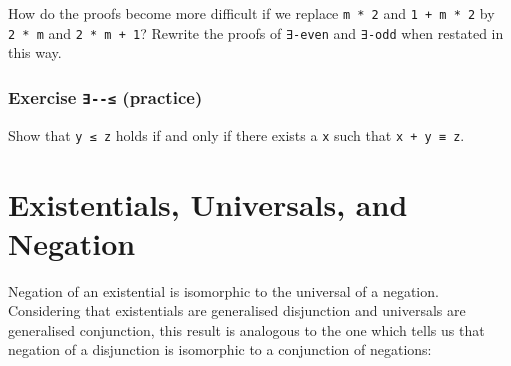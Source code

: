 How do the proofs become more difficult if we replace \texttt{m\ *\ 2}
and \texttt{1\ +\ m\ *\ 2} by \texttt{2\ *\ m} and
\texttt{2\ *\ m\ +\ 1}? Rewrite the proofs of \texttt{∃-even} and
\texttt{∃-odd} when restated in this way.

\begin{fence}
\begin{code}%
\>[0]\<%
\end{code}
\end{fence}

\hypertarget{exercise----practice}{%
\subsubsection{\texorpdfstring{Exercise \texttt{∃-\textbar{}-≤}
(practice)}{Exercise ∃-\textbar-≤ (practice)}}\label{exercise----practice}}

Show that \texttt{y\ ≤\ z} holds if and only if there exists a
\texttt{x} such that \texttt{x\ +\ y\ ≡\ z}.

\begin{fence}
\begin{code}%
\>[0]\<%
\end{code}
\end{fence}

\hypertarget{existentials-universals-and-negation}{%
\section{Existentials, Universals, and
Negation}\label{existentials-universals-and-negation}}

Negation of an existential is isomorphic to the universal of a negation.
Considering that existentials are generalised disjunction and universals
are generalised conjunction, this result is analogous to the one which
tells us that negation of a disjunction is isomorphic to a conjunction
of negations:

